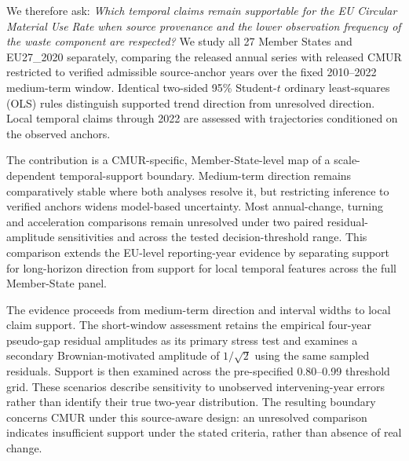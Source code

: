 We therefore ask: \emph{Which temporal claims remain supportable for the EU Circular Material Use Rate when source provenance and the lower observation frequency of the waste component are respected?} We study all 27 Member States and EU27\_2020 separately, comparing the released annual series with released CMUR restricted to verified admissible source-anchor years over the fixed 2010--2022 medium-term window. Identical two-sided 95\% Student-$t$ ordinary least-squares (OLS) rules distinguish supported trend direction from unresolved direction. Local temporal claims through 2022 are assessed with trajectories conditioned on the observed anchors.

The contribution is a CMUR-specific, Member-State-level map of a scale-dependent temporal-support boundary. Medium-term direction remains comparatively stable where both analyses resolve it, but restricting inference to verified anchors widens model-based uncertainty. Most annual-change, turning and acceleration comparisons remain unresolved under two paired residual-amplitude sensitivities and across the tested decision-threshold range. This comparison extends the EU-level reporting-year evidence by separating support for long-horizon direction from support for local temporal features across the full Member-State panel.

The evidence proceeds from medium-term direction and interval widths to local claim support. The short-window assessment retains the empirical four-year pseudo-gap residual amplitudes as its primary stress test and examines a secondary Brownian-motivated amplitude of $1/\sqrt{2}$ using the same sampled residuals. Support is then examined across the pre-specified 0.80--0.99 threshold grid. These scenarios describe sensitivity to unobserved intervening-year errors rather than identify their true two-year distribution. The resulting boundary concerns CMUR under this source-aware design: an unresolved comparison indicates insufficient support under the stated criteria, rather than absence of real change.
